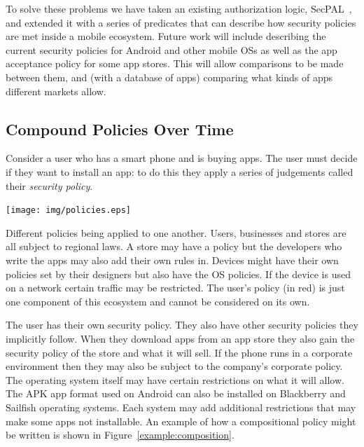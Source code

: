 \documentclass[a4paper]{article}
\begin{document}
To solve these problems we have taken an existing authorization logic,
SecPAL~\cite{Becker:2006vh}, and extended it with a series of predicates that can
describe how security policies are met inside a mobile ecosystem.  Future work
will include describing the current security policies for Android and other
mobile OSs as well as the app acceptance policy for some app stores.  This will allow comparisons to be
made between them, and (with a database of apps) comparing what kinds of apps
different markets allow.

\subsection{Compound Policies Over Time}\label{sec:polovertime}

Consider a user who has a smart phone and is buying apps.  The
user must decide if they want to install an app: to do this they apply a series
of judgements called their \emph{security policy}.  

\begin{marginfigure}
  \label{fig:policies}
  \texttt{[image: img/policies.eps]}
  \caption{Different policies being applied to one another.  Users, businesses
  and stores are all subject to regional laws.  A store may have a policy but
the developers who write the apps may also add their own rules in.  Devices
might have their own policies set by their designers but also have the OS
policies.  If the device is used on a network certain traffic may be restricted.
The user's policy (in red) is just one component of this ecosystem and cannot be
considered on its own.}
\end{marginfigure}

The user has their own security policy. They also have other security policies
they implicitly follow.  When they download apps from an app store they also
gain the security policy of the store and what it will sell.  If the phone runs
in a corporate environment then they may also be subject to the company's
corporate policy.  The operating system itself may have certain restrictions on
what it will allow.  The APK app format used on Android can also be installed on
Blackberry and Sailfish operating systems.  Each system may add
additional restrictions that may make some apps not installable.  An example of
how a compositional policy might be written is shown in
Figure~\ref{example:composition}.
\end{document}

